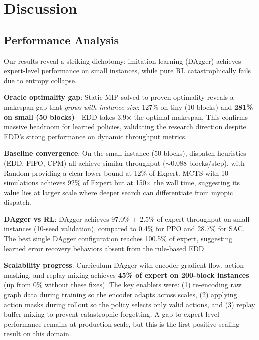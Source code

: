 \documentclass[11pt,a4paper]{article}
\begin{document}
\section{Discussion}
\label{sec:discussion}

\subsection{Performance Analysis}

Our results reveal a striking dichotomy: imitation learning (DAgger) achieves expert-level performance on small instances, while pure RL catastrophically fails due to entropy collapse.

\textbf{Oracle optimality gap}: Static MIP solved to proven optimality reveals a makespan gap that \textit{grows with instance size}: 127\% on tiny (10 blocks) and \textbf{281\% on small (50 blocks)}---EDD takes 3.9$\times$ the optimal makespan. This confirms massive headroom for learned policies, validating the research direction despite EDD's strong performance on dynamic throughput metrics.

\textbf{Baseline convergence}: On the small instance (50 blocks), dispatch heuristics (EDD, FIFO, CPM) all achieve similar throughput ($\sim$0.088 blocks/step), with Random providing a clear lower bound at 12\% of Expert. MCTS with 10 simulations achieves 92\% of Expert but at 150$\times$ the wall time, suggesting its value lies at larger scale where deeper search can differentiate from myopic dispatch.

\textbf{DAgger vs RL}: DAgger achieves 97.0\% $\pm$ 2.5\% of expert throughput on small instances (10-seed validation), compared to 0.4\% for PPO and 28.7\% for SAC. The best single DAgger configuration reaches 100.5\% of expert, suggesting learned error recovery behaviors absent from the rule-based EDD.

\textbf{Scalability progress}: Curriculum DAgger with encoder gradient flow, action masking, and replay mixing achieves \textbf{45\% of expert on 200-block instances} (up from 0\% without these fixes). The key enablers were: (1) re-encoding raw graph data during training so the encoder adapts across scales, (2) applying action masks during rollout so the policy selects only valid actions, and (3) replay buffer mixing to prevent catastrophic forgetting. A gap to expert-level performance remains at production scale, but this is the first positive scaling result on this domain.
\end{document}
